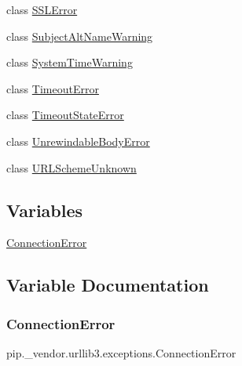 \begin{DoxyCompactItemize}
class \hyperlink{classpip_1_1__vendor_1_1urllib3_1_1exceptions_1_1SSLError}{S\+S\+L\+Error}
\item 
class \hyperlink{classpip_1_1__vendor_1_1urllib3_1_1exceptions_1_1SubjectAltNameWarning}{Subject\+Alt\+Name\+Warning}
\item 
class \hyperlink{classpip_1_1__vendor_1_1urllib3_1_1exceptions_1_1SystemTimeWarning}{System\+Time\+Warning}
\item 
class \hyperlink{classpip_1_1__vendor_1_1urllib3_1_1exceptions_1_1TimeoutError}{Timeout\+Error}
\item 
class \hyperlink{classpip_1_1__vendor_1_1urllib3_1_1exceptions_1_1TimeoutStateError}{Timeout\+State\+Error}
\item 
class \hyperlink{classpip_1_1__vendor_1_1urllib3_1_1exceptions_1_1UnrewindableBodyError}{Unrewindable\+Body\+Error}
\item 
class \hyperlink{classpip_1_1__vendor_1_1urllib3_1_1exceptions_1_1URLSchemeUnknown}{U\+R\+L\+Scheme\+Unknown}
\end{DoxyCompactItemize}
\subsection*{Variables}
\begin{DoxyCompactItemize}
\item 
\hyperlink{namespacepip_1_1__vendor_1_1urllib3_1_1exceptions_a8508210f910638a43df59e9e94de6cc4}{Connection\+Error}
\end{DoxyCompactItemize}


\subsection{Variable Documentation}
\mbox{\label{namespacepip_1_1__vendor_1_1urllib3_1_1exceptions_a8508210f910638a43df59e9e94de6cc4}} 
\subsubsection{\texorpdfstring{Connection\+Error}{ConnectionError}}
{\footnotesize\ttfamily pip.\+\_\+vendor.\+urllib3.\+exceptions.\+Connection\+Error}

